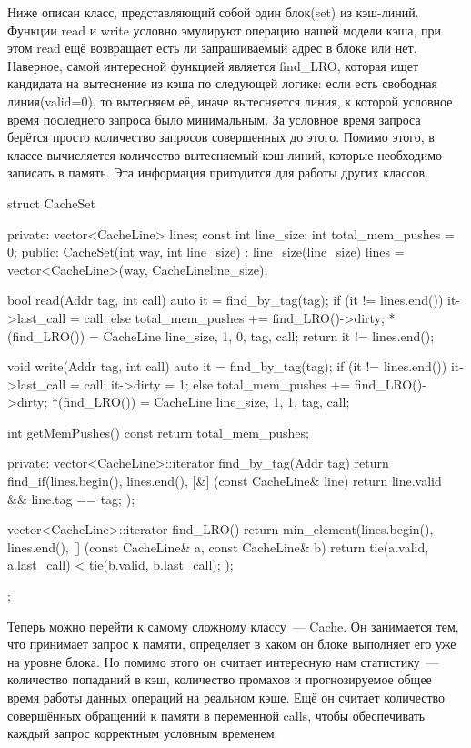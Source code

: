 \documentclass[14pt, russian, onesize]{extreport}
\begin{document}
Ниже описан класс, представляющий собой один блок(set) из кэш-линий.
Функции read и write условно эмулируют операцию нашей модели
кэша, при этом read ещё возвращает есть ли запрашиваемый
адрес в блоке или нет. Наверное, самой интересной функцией
является find\_LRO, которая ищет кандидата на вытеснение из
кэша по следующей логике: если есть свободная линия(valid=0),
то вытесняем её, иначе вытесняется линия, к которой условное время
последнего запроса было минимальным. За условное время запроса
берётся просто количество запросов совершенных до этого.
Помимо этого, в классе вычисляется количество
вытесняемый кэш линий, которые необходимо записать в память.
Эта информация пригодится для работы других классов.
\begin{cppcode}
struct CacheSet {
private:
    vector<CacheLine> lines;
    const int line_size;
    int total_mem_pushes = 0;
public:
    CacheSet(int way, int line_size) : line_size(line_size) {
        lines = vector<CacheLine>(way, CacheLine{line_size});
    }

    bool read(Addr tag, int call) {
        auto it = find_by_tag(tag);
        if (it != lines.end()) {
            it->last_call = call;
        } else {
            total_mem_pushes += find_LRO()->dirty;
            *(find_LRO()) = CacheLine {line_size, 1, 0, tag, call};
        }
        return it != lines.end(); 
    }

    void write(Addr tag, int call) {
        auto it = find_by_tag(tag);
        if (it != lines.end()) {
            it->last_call = call;
            it->dirty = 1;
        } else {
            total_mem_pushes += find_LRO()->dirty;
            *(find_LRO()) = CacheLine {line_size, 1, 1, tag, call};
        }
    }

    int getMemPushes() const {
        return total_mem_pushes;
    }

private:
    vector<CacheLine>::iterator find_by_tag(Addr tag) {
        return find_if(lines.begin(), lines.end(), [&] (const CacheLine& line) {
                return line.valid && line.tag == tag;
            }
        );
    }

    vector<CacheLine>::iterator find_LRO() {
        return min_element(lines.begin(), lines.end(), [] (const CacheLine& a, const CacheLine& b) {
            return tie(a.valid, a.last_call) < tie(b.valid, b.last_call);
        });
    }
};
\end{cppcode}

Теперь можно перейти к самому сложному классу~--- Cache. Он
занимается тем, что принимает запрос к памяти, определяет
в каком он блоке выполняет его уже на уровне блока. Но помимо
этого он считает интересную нам статистику~--- количество
попаданий в кэш, количество промахов и прогнозируемое общее
время работы данных операций на реальном кэше. Ещё он
считает количество совершённых обращений к памяти в
переменной calls, чтобы 
обеспечивать каждый запрос корректным условным временем.
\end{document}
